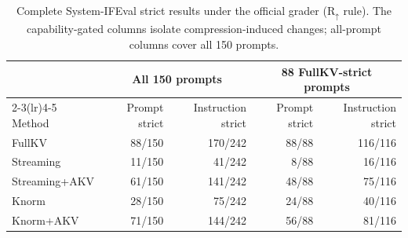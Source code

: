 \begin{table}[t]
\centering
\small
\setlength{\tabcolsep}{4.2pt}
\begin{tabular}{lrrrr}
\toprule
& \multicolumn{2}{c}{All 150 prompts} & \multicolumn{2}{c}{88 FullKV-strict prompts} \\
\cmidrule(lr){2-3}\cmidrule(lr){4-5}
Method & Prompt strict & Instruction strict & Prompt strict & Instruction strict \\
\midrule
FullKV & 88/150 & 170/242 & 88/88 & 116/116 \\
Streaming & 11/150 & 41/242 & 8/88 & 16/116 \\
Streaming+AKV & 61/150 & 141/242 & 48/88 & 75/116 \\
Knorm & 28/150 & 75/242 & 24/88 & 40/116 \\
Knorm+AKV & 71/150 & 144/242 & 56/88 & 81/116 \\
\bottomrule
\end{tabular}
\caption{Complete System-IFEval strict results under the official grader (\(\mathrm{R}_{\uparrow}\) rule). The capability-gated columns isolate compression-induced changes; all-prompt columns cover all 150 prompts.}
\label{tab:ifeval-full}
\end{table}
